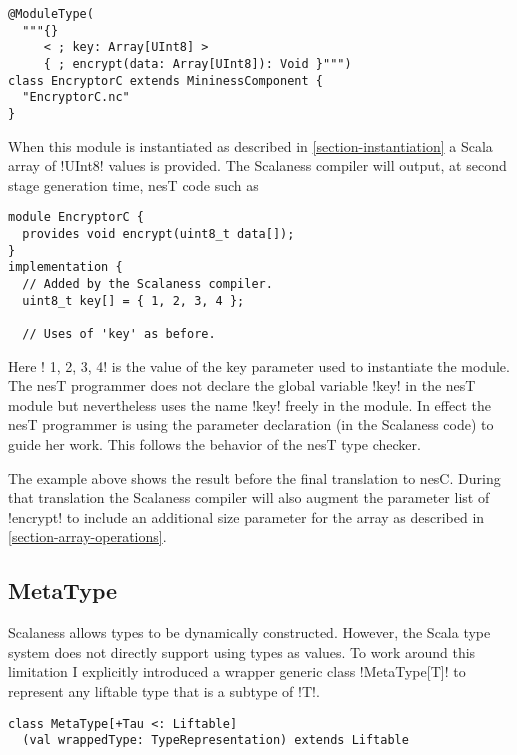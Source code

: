 \singlespace
\begin{lstlisting}[language=scalaness]
@ModuleType(
  """{}
     < ; key: Array[UInt8] >
     { ; encrypt(data: Array[UInt8]): Void }""")
class EncryptorC extends MininessComponent {
  "EncryptorC.nc"
}
\end{lstlisting}
\primaryspacing

When this module is instantiated as described in \autoref{section-instantiation} a Scala array
of !UInt8! values is provided. The Scalaness compiler will output, at second stage generation
time, nesT code such as

\singlespace
\begin{lstlisting}[language=nesC]
module EncryptorC {
  provides void encrypt(uint8_t data[]);
}
implementation {
  // Added by the Scalaness compiler.
  uint8_t key[] = { 1, 2, 3, 4 };

  // Uses of 'key' as before.
\end{lstlisting}
\primaryspacing

Here !{ 1, 2, 3, 4}! is the value of the key parameter used to instantiate the module. The nesT
programmer does not declare the global variable !key! in the nesT module but nevertheless uses
the name !key! freely in the module. In effect the nesT programmer is using the parameter
declaration (in the Scalaness code) to guide her work. This follows the behavior of the nesT
type checker.

The example above shows the result before the final translation to nesC. During that translation
the Scalaness compiler will also augment the parameter list of !encrypt! to include an
additional size parameter for the array as described in \autoref{section-array-operations}.


\subsection{MetaType}
\label{section-metatype}

Scalaness allows types to be dynamically constructed. However, the Scala type system does not
directly support using types as values. To work around this limitation I explicitly introduced a
wrapper generic class !MetaType[T]! to represent any liftable type that is a subtype of !T!.

\singlespace
\begin{lstlisting}[language=scalaness]
class MetaType[+Tau <: Liftable]
  (val wrappedType: TypeRepresentation) extends Liftable
\end{lstlisting}
\primaryspacing

